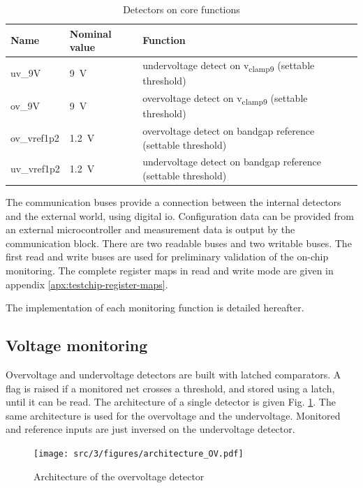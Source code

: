 \begin{table}[!htbp]
\centering
\begin{tabular}{@{}lll@{}}
\toprule
Name           & Nominal value     & Function \\ \toprule
uv\_9V	       & \SI{9}{\volt}     & undervoltage detect on v\textsubscript{clamp9} (settable threshold)\\
ov\_9V	       & \SI{9}{\volt}     & overvoltage detect on v\textsubscript{clamp9} (settable threshold)\\
ov\_vref1p2	   & \SI{1.2}{\volt}   & overvoltage detect on bandgap reference (settable threshold) \\
uv\_vref1p2	   & \SI{1.2}{\volt}   & undervoltage detect on bandgap reference (settable threshold) \\
\bottomrule
\end{tabular}
\caption{Detectors on core functions}
\label{tab:detectors}
\end{table}

The communication buses provide a connection between the internal detectors and the external world, using digital \gls{io}.
Configuration data can be provided from an external microcontroller and measurement data is output by the communication block.
There are two readable buses and two writable buses.
The first read and write buses are used for preliminary validation of the on-chip monitoring.
The complete register maps in read and write mode are given in appendix \ref{apx:testchip-register-maps}.

The implementation of each monitoring function is detailed hereafter.

\subsection{Voltage monitoring}

Overvoltage and undervoltage detectors are built with latched comparators.
A flag is raised if a monitored net crosses a threshold, and stored using a latch, until it can be read.
The architecture of a single detector is given Fig. \ref{fig:architecture-ov}.
The same architecture is used for the overvoltage and the undervoltage.
Monitored and reference inputs are just inversed on the undervoltage detector.

\begin{figure}[!h]
  \centering
  \texttt{[image: src/3/figures/architecture\_OV.pdf]}
  \caption{Architecture of the overvoltage detector}
  \label{fig:architecture-ov}
\end{figure}

